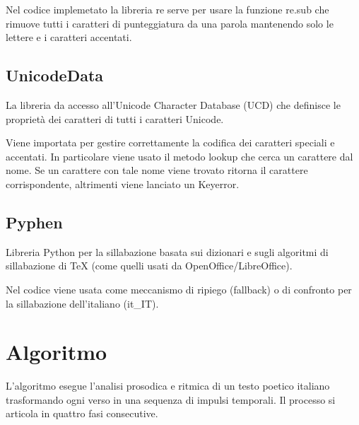 Nel codice implemetato la libreria re serve per usare la funzione re.sub che rimuove tutti i caratteri di punteggiatura da una parola mantenendo solo le lettere e i caratteri accentati.
\subsection{UnicodeData}
La libreria da accesso all'Unicode Character Database (UCD) che definisce le proprietà dei caratteri di tutti i caratteri Unicode. 


Viene importata per gestire correttamente la codifica dei caratteri speciali e accentati.
In particolare viene usato il metodo lookup che cerca un carattere dal nome. Se un carattere con tale nome viene trovato ritorna il carattere corrispondente, altrimenti viene lanciato un Keyerror.
\subsection{Pyphen}
Libreria Python per la sillabazione basata sui dizionari e sugli algoritmi di sillabazione di TeX (come quelli usati da OpenOffice/LibreOffice). 

Nel codice viene usata come meccanismo di ripiego (fallback) o di confronto per la sillabazione dell'italiano (it\_IT).
\section{Algoritmo}
L'algoritmo esegue l'analisi prosodica e ritmica di un testo poetico italiano trasformando ogni verso in una sequenza di impulsi temporali. Il processo si articola in quattro fasi consecutive.
